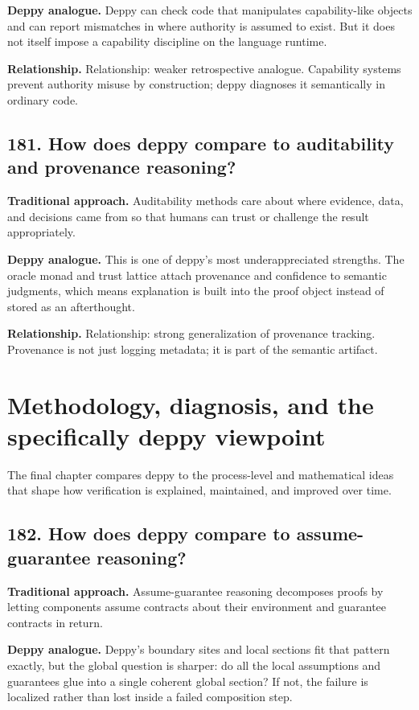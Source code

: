 \documentclass[11pt,openany]{book}
\begin{document}
\textbf{Deppy analogue.} Deppy can check code that manipulates capability-like objects and can report mismatches in where authority is assumed to exist. But it does not itself impose a capability discipline on the language runtime.

\textbf{Relationship.} Relationship: weaker retrospective analogue. Capability systems prevent authority misuse by construction; deppy diagnoses it semantically in ordinary code.

\section*{181. How does deppy compare to auditability and provenance reasoning?}
\textbf{Traditional approach.} Auditability methods care about where evidence, data, and decisions came from so that humans can trust or challenge the result appropriately.

\textbf{Deppy analogue.} This is one of deppy's most underappreciated strengths. The oracle monad and trust lattice attach provenance and confidence to semantic judgments, which means explanation is built into the proof object instead of stored as an afterthought.

\textbf{Relationship.} Relationship: strong generalization of provenance tracking. Provenance is not just logging metadata; it is part of the semantic artifact.

\chapter{Methodology, diagnosis, and the specifically deppy viewpoint}
The final chapter compares deppy to the process-level and mathematical ideas that shape how verification is explained, maintained, and improved over time.

\section*{182. How does deppy compare to assume-guarantee reasoning?}
\textbf{Traditional approach.} Assume-guarantee reasoning decomposes proofs by letting components assume contracts about their environment and guarantee contracts in return.

\textbf{Deppy analogue.} Deppy's boundary sites and local sections fit that pattern exactly, but the global question is sharper: do all the local assumptions and guarantees glue into a single coherent global section? If not, the failure is localized rather than lost inside a failed composition step.
\end{document}
